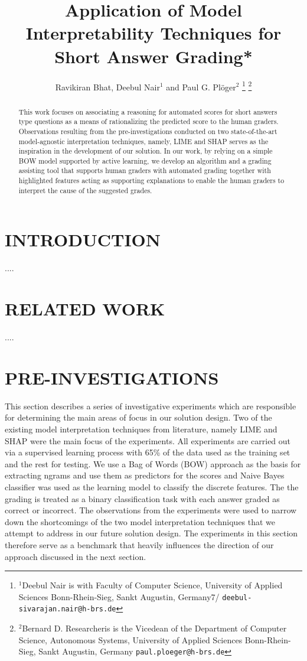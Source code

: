 \documentclass[letterpaper, 10 pt, conference]{ieeeconf}  %
\title{\LARGE \bf
Application of Model Interpretability Techniques for Short Answer Grading*
}
\author{Ravikiran Bhat, Deebul Nair$^{1}$ and Paul G. Pl{\"o}ger$^{2}$%
\thanks{$^{1}$Deebul Nair is with Faculty of Computer Science,
        University of Applied Sciences Bonn-Rhein-Sieg, Sankt Augustin, Germany7/
        {\tt\small deebul-sivarajan.nair@h-brs.de}}%
\thanks{$^{2}$Bernard D. Researcheris is the Vicedean of the Department of Computer Science, Autonomous Systems, University of Applied Sciences Bonn-Rhein-Sieg, Sankt Augustin, Germany
        {\tt\small paul.ploeger@h-brs.de}}%
}
\begin{document}
\maketitle
\thispagestyle{empty}
\pagestyle{empty}


\begin{abstract}

This work focuses on associating a reasoning for automated scores for short answers type questions as a means of rationalizing the predicted score to the human graders. Observations resulting from the pre-investigations conducted on two state-of-the-art model-agnostic interpretation techniques, namely, LIME and SHAP serves as the inspiration in the development of our solution. In our work, by relying on a simple BOW model supported by active learning, we develop an algorithm and a grading assisting tool that supports human graders with automated grading together with highlighted features acting as supporting explanations to enable the human graders to interpret the cause of the suggested grades. 

\end{abstract}


\section{INTRODUCTION}

....

\section{RELATED WORK}
....

\section{PRE-INVESTIGATIONS}

This section describes a series of investigative experiments which are responsible for determining the main areas of focus in our solution design. Two of the existing model interpretation techniques from literature, namely LIME and SHAP were the main focus of the experiments. All experiments are carried out via a supervised learning process with 65\% of the data used as the training set and the rest for testing. We use a Bag of Words (BOW) approach as the basis for extracting ngrams and use them as predictors for the scores and Naive Bayes classifier was used as the learning model to classify the discrete features. The the grading is treated as a binary classification task with each answer graded as correct or incorrect. The observations from the experiments were used to narrow down the shortcomings of the two model interpretation techniques that we attempt to address in our future solution design. The experiments in this section therefore serve as a benchmark that heavily influences the direction of our approach discussed in the next section.
\end{document}
